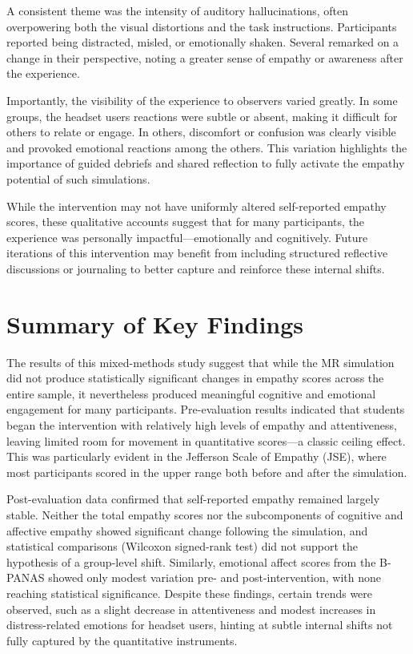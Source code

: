 A consistent theme was the intensity of auditory hallucinations, often overpowering both the visual distortions and the task instructions. Participants reported being distracted, misled, or emotionally shaken. Several remarked on a change in their perspective, noting a greater sense of empathy or awareness after the experience.

\vspace{1em}

Importantly, the visibility of the experience to observers varied greatly. In some groups, the headset users reactions were subtle or absent, making it difficult for others to relate or engage. In others, discomfort or confusion was clearly visible and provoked emotional reactions among the others. This variation highlights the importance of guided debriefs and shared reflection to fully activate the empathy potential of such simulations.

While the intervention may not have uniformly altered self-reported empathy scores, these qualitative accounts suggest that for many participants, the experience was personally impactful—emotionally and cognitively. Future iterations of this intervention may benefit from including structured reflective discussions or journaling to better capture and reinforce these internal shifts.


\section{Summary of Key Findings}

The results of this mixed-methods study suggest that while the MR simulation did not produce statistically significant changes in empathy scores across the entire sample, it nevertheless produced meaningful cognitive and emotional engagement for many participants. Pre-evaluation results indicated that students began the intervention with relatively high levels of empathy and attentiveness, leaving limited room for  movement in quantitative scores—a classic ceiling effect. This was particularly evident in the Jefferson Scale of Empathy (JSE), where most participants scored in the upper range both before and after the simulation.

\vspace{1em}

Post-evaluation data confirmed that self-reported empathy remained largely stable. Neither the total empathy scores nor the subcomponents of cognitive and affective empathy showed significant change following the simulation, and statistical comparisons (Wilcoxon signed-rank test) did not support the hypothesis of a group-level shift. Similarly, emotional affect scores from the B-PANAS showed only modest variation pre- and post-intervention, with none reaching statistical significance. Despite these findings, certain trends were observed, such as a slight decrease in attentiveness and modest increases in distress-related emotions for headset users, hinting at subtle internal shifts not fully captured by the quantitative instruments.

